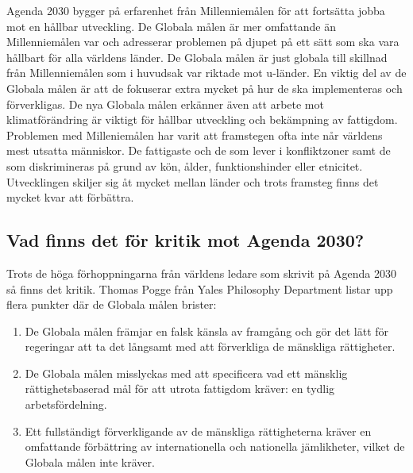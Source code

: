 \documentclass{report}
\begin{document}
Agenda 2030 bygger på erfarenhet från Millenniemålen för att fortsätta jobba mot en hållbar utveckling. \cite{webEuropeanComission}
De Globala målen är mer omfattande än Millenniemålen var och adresserar problemen på djupet på ett sätt som ska vara hållbart för alla världens länder. De Globala målen är just globala till skillnad från Millenniemålen som i huvudsak var riktade mot u-länder. En viktig del av de Globala målen är att de fokuserar extra mycket på hur de ska implementeras och förverkligas. De nya Globala målen erkänner även att arbete mot klimatförändring är viktigt för hållbar utveckling och bekämpning av fattigdom. \cite{web2030agenda}
Problemen med Milleniemålen har varit att framstegen ofta inte når världens mest utsatta människor. De fattigaste och de som lever i konfliktzoner samt de som diskrimineras på grund av kön, ålder, funktionshinder eller etnicitet. Utvecklingen skiljer sig åt mycket mellan länder och trots framsteg finns det mycket kvar att förbättra. \cite{MIllennium} \\

\subsection{Vad finns det för kritik mot Agenda 2030?} 
Trots de höga förhoppningarna från världens ledare som skrivit på Agenda 2030 så finns det kritik. Thomas Pogge från Yales Philosophy Department listar upp flera punkter där de Globala målen brister: 

\begin{enumerate}
\item De Globala målen främjar en falsk känsla av framgång och gör det lätt för regeringar att ta det långsamt med att förverkliga de mänskliga rättigheter. 
\item De Globala målen misslyckas med att specificera vad ett mänsklig rättighetsbaserad mål för att utrota fattigdom kräver: en tydlig arbetsfördelning. 
\item Ett fullständigt förverkligande av de mänskliga rättigheterna kräver en omfattande förbättring av internationella och nationella jämlikheter, vilket de Globala målen inte kräver. \cite{critique}\\
\end{enumerate} 
\end{document}
